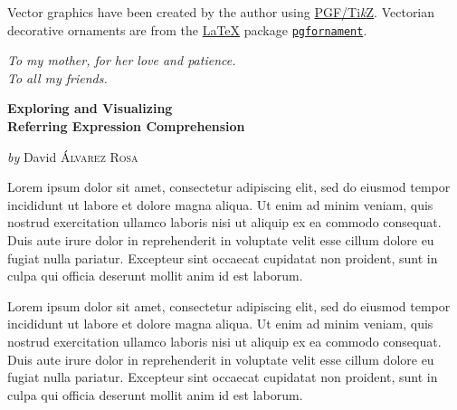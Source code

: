 Vector graphics have been created by the author using
\href{https://www.ctan.org/pkg/pgf}{PGF/Ti\emph{k}Z}. Vectorian decorative
ornaments are from the \href{https://www.latex-project.org//}{\LaTeX} package
\href{https://ctan.org/pkg/pgfornament}{\texttt{pgfornament}}.


\doclicenseThis
\normalsize



\cleardoublepage
\thispagestyle{empty}
\begin{flushright}
  \itshape
  To my mother, for her love and patience. \\
  To all my friends.
\end{flushright}



\cleardoublepage
\thispagestyle{plain}
\null\vfill

\begin{center}
  \Large
  \textbf{Exploring and Visualizing\\
    Referring Expression Comprehension}

  \vspace{2ex}
  \large
  \textit{by} David \textsc{Álvarez Rosa}

  \vspace{3ex}
  \textbf{\abstractname}
\end{center}

\vspace{-2ex}
\noindent Lorem ipsum dolor sit amet, consectetur adipiscing elit, sed do
eiusmod tempor incididunt ut labore et dolore magna aliqua. Ut enim ad minim
veniam, quis nostrud exercitation ullamco laboris nisi ut aliquip ex ea commodo
consequat. Duis aute irure dolor in reprehenderit in voluptate velit esse
cillum dolore eu fugiat nulla pariatur. Excepteur sint occaecat cupidatat non
proident, sunt in culpa qui officia deserunt mollit anim id est laborum.

Lorem ipsum dolor sit amet, consectetur adipiscing elit, sed do
eiusmod tempor incididunt ut labore et dolore magna aliqua. Ut enim ad minim
veniam, quis nostrud exercitation ullamco laboris nisi ut aliquip ex ea commodo
consequat. Duis aute irure dolor in reprehenderit in voluptate velit esse
cillum dolore eu fugiat nulla pariatur. Excepteur sint occaecat cupidatat non
proident, sunt in culpa qui officia deserunt mollit anim id est laborum.

